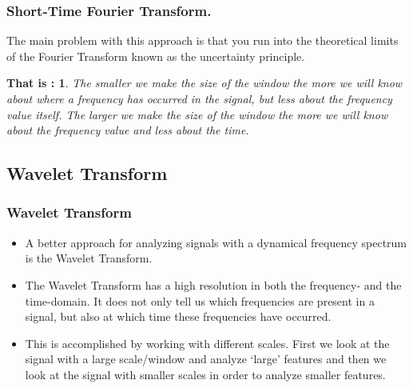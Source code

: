 \documentclass{beamer}
\newtheorem{thatis}{That is :}
\begin{document}
\begin{frame}
	\frametitle{Short-Time Fourier Transform.}
	The main problem with this approach is that you run into the theoretical limits of the Fourier Transform known as the uncertainty principle.
	\begin{thatis}
		The smaller we make the size of the window the more we will know about where a frequency has occurred in the signal, but less about the frequency value itself. The larger we make the size of the window the more we will know about the frequency value and less about the time.
	\end{thatis}
	
\end{frame}


\subsection{Wavelet Transform}
\begin{frame}
	\frametitle{Wavelet Transform}
	
	\begin{itemize}
		\item
		A better approach for analyzing signals with a dynamical frequency spectrum is the Wavelet Transform.
		\item
		The Wavelet Transform has a high resolution in both the frequency- and the time-domain. It does not only tell us which frequencies are present in a signal, but also at which time these frequencies have occurred.
		
		\item
		This is accomplished by working with different scales. First we look at the signal with a large scale/window and analyze ‘large’ features and then we look at the signal with smaller scales in order to analyze smaller features.
		
		
	\end{itemize}

\end{frame}
\end{document}

